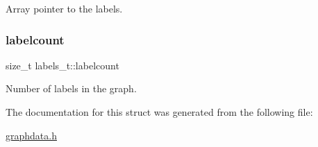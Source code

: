 Array pointer to the labels. \mbox{\label{structlabels__t_af5b7ba7df24db052d4eb4d762a027039}} 
\subsubsection{\texorpdfstring{labelcount}{labelcount}}
{\footnotesize\ttfamily size\+\_\+t labels\+\_\+t\+::labelcount}

Number of labels in the graph. 

The documentation for this struct was generated from the following file\+:\begin{DoxyCompactItemize}
\item 
\hyperlink{graphdata_8h}{graphdata.\+h}\end{DoxyCompactItemize}
